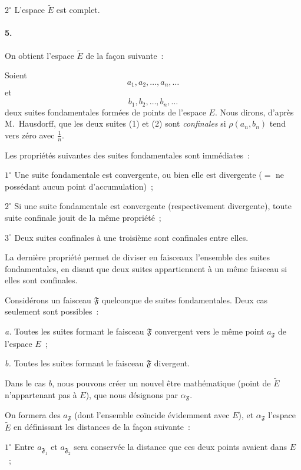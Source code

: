 \documentclass[a4paper,12pt]{amsart}
\newcommand{\fais}{\mathfrak{F}}
\newcommand{\srcpage}[1]{} %
\begin{document}
$2^\circ$ L'espace $\widetilde{E}$ est complet.

\paragraph{5.}
On obtient l'espace $\widetilde{E}$ de la façon suivante~:

Soient
\begin{equation}\tag{1}
a_1,a_2,\dots,a_n,\dots
\end{equation}
et
\begin{equation}\tag{2}
b_1,b_2,\dots,b_n,\dots
\end{equation}
deux suites fondamentales formées de points de l'espace $E$. Nous dirons, d'après M.~Hausdorff, que les deux suites (1) et (2) sont \textit{confinales} si $\rho(a_n,b_n)$ tend vers zéro avec $\frac{1}{n}$.

Les propriétés suivantes des suites fondamentales sont immédiates~:

$1^\circ$ Une suite fondamentale est convergente, ou bien elle est divergente ($=$ ne possédant aucun point d'accumulation)~;

$2^\circ$ Si une suite fondamentale est convergente (respectivement divergente), toute suite confinale jouit de la même propriété~;

$3^\circ$ Deux suites confinales à une troisième sont confinales entre elles.

La dernière propriété permet de diviser en faisceaux l'ensemble des suites fondamentales, en disant que deux suites appartiennent à un même faisceau si elles sont confinales.

Considérons un faisceau $\fais$ quelconque de suites fondamentales. Deux cas seulement sont possibles~:

\textit{a.} Toutes les suites formant le faisceau $\fais$ convergent vers le même point $a_{\fais}$ de l'espace $E$~;

\textit{b.} Toutes les suites formant le faisceau $\fais$ divergent.

Dans le cas \textit{b}, nous pouvons créer un nouvel être mathématique (point de $\widetilde{E}$ n'appartenant pas à $E$), que nous désignons par $\alpha_{\fais}$.

On formera des $a_{\fais}$ (dont l'ensemble coïncide évidemment avec $E$), et $\alpha_{\fais}$ l'espace $\widetilde{E}$ en définissant les distances de la façon suivante~:
\srcpage{48}

$1^\circ$ Entre $a_{\fais_1}$ et $a_{\fais_2}$ sera conservée la distance que ces deux points avaient dans $E$~;
\end{document}
